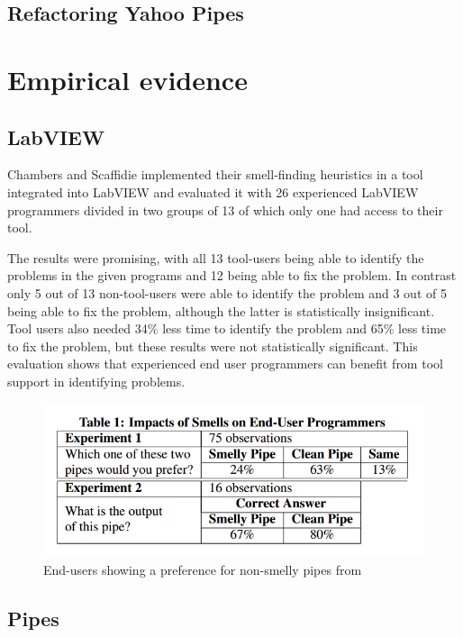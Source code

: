 \documentclass[10pt,conference,compsocconf]{IEEEtran}
\begin{document}
\subsection{Refactoring Yahoo Pipes}

\section{Empirical evidence}
\label{sec:empirical}

\subsection{LabVIEW}

Chambers and Scaffidie implemented their smell-finding heuristics in a tool integrated into LabVIEW and evaluated it with 26 experienced LabVIEW programmers divided in two groups of 13 of which only one had access to their tool.

The results were promising, with all 13 tool-users being able to identify the problems in the given programs and 12 being able to fix the problem.
In contrast only 5 out of 13 non-tool-users were able to identify the problem and 3 out of 5 being able to fix the problem, although the latter is statistically insignificant.
Tool users also needed 34\% less time to identify the problem and 65\% less time to fix the problem, but these results were not statistically significant.
This evaluation shows that experienced end user programmers can benefit from tool support in identifying problems.

\begin{figure}
\centering
\includegraphics[width=\columnwidth]{Table1-Stolee2011}
\caption{End-users showing a preference for non-smelly pipes from \cite{Stolee2011}}
\label{fig:Table1-Stolee2011}
\end{figure}


\subsection{Pipes}
\end{document}
